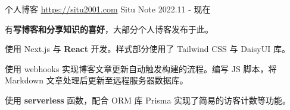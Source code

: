 
\begin{cventries}



    \cventry
    {个人博客 \href{https://situ2001.com}{https://situ2001.com}} %
    {Situ Note} %
    {} %
    {2022.11 - 现在} %
    {
        \begin{cvitems} %
            \item {有\textbf{写博客和分享知识的喜好}，大部分个人博客发布于此。}
            \item {使用 Next.js 与 \textbf{React} 开发。样式部分使用了 Tailwind CSS 与 DaisyUI 库。}
            \item {使用 webhooks 实现博客文章更新自动触发构建的流程。编写 JS 脚本，将 Markdown 文章处理后更新至远程服务器数据库。}
            \item {使用 \textbf{serverless} 函数，配合 ORM 库 Prisma 实现了简易的访客计数等功能。}
        \end{cvitems}
    }

\end{cventries}
